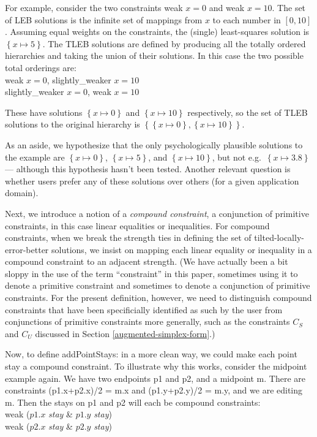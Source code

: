 \documentclass{article}
\newcommand{\strength}{\rm}
\begin{document}
For example, consider the two constraints {\strength weak} $x=0$ and
{\strength weak} $x=10$.  The set of LEB solutions is the infinite set
of mappings from $x$ to each number in $\left[ 0, 10 \right]$.  Assuming 
equal weights on the constraints, the (single)
least-squares solution is $\left\{ x \mapsto 5 \right\}$.  The TLEB 
solutions are defined by
producing all the totally ordered hierarchies and taking the union of their
solutions.  In this case the two possible total orderings are: \\
\hspace*{1cm} {\strength weak} $x=0$, {\strength slightly\_weaker} $x=10$ \\
\hspace*{1cm} {\strength slightly\_weaker} $x=0$, {\strength weak} $x=10$

These have solutions $\left\{ x \mapsto 0 \right\}$ and 
$\left\{ x \mapsto 10 \right\}$ respectively, so the set of TLEB 
solutions to the original hierarchy is 
$\left\{ \left\{ x \mapsto 0 \right\} , 
    \left\{ x \mapsto 10 \right\} \right\}$.  

As an aside, we hypothesize that the only psychologically plausible
solutions to the example are $\left\{ x \mapsto 0\right\}$, 
$\left\{ x \mapsto 5\right\} $, and $\left\{ x \mapsto 10\right\}$, 
but not e.g.\ $\left\{ x \mapsto 3.8\right\} $ --- although this hypothesis
hasn't been tested.  Another relevant question is whether users prefer any
of these solutions over others (for a given application domain).

Next, we introduce a notion of a {\em compound constraint}, a conjunction
of primitive constraints, in this case linear equalities or inequalities.
For compound constraints, when we break the strength ties in defining the
set of tilted-locally-error-better solutions, we insist on mapping each
linear equality or inequality in a compound constraint to an adjacent
strength.  (We have actually been a bit sloppy in the use of the term
``constraint'' in this paper, sometimes using it to denote a primitive
constraint and sometimes to denote a conjunction of primitive constraints.
For the present definition, however, we need to distinguish compound
constraints that have been specificially identified as such by the user
from conjunctions of primitive constraints more generally, such as the
constraints $C_S$ and $C_U$ discussed in Section \ref{augmented-simplex-form}.)

Now, to define {\sf addPointStays:} in a more clean way, we could make each
point stay a compound constraint.  To illustrate why this works, consider
the midpoint example again.  We have two endpoints {\sf p1} and {\sf p2},
and a midpoint {\sf m}.  There are constraints {\sf (p1.x+p2.x)/2 = m.x}
and {\sf (p1.y+p2.y)/2 = m.y}, and we are editing {\sf m}.  Then the stays
on {\sf p1} and {\sf p2} will each be compound constraints:  \\
\hspace*{1cm} {\strength weak} ($p1.x$ {\em stay} \& $p1.y$ {\em stay}) \\
\hspace*{1cm} {\strength weak} ($p2.x$ {\em stay} \& $p2.y$ {\em stay})
\end{document}
